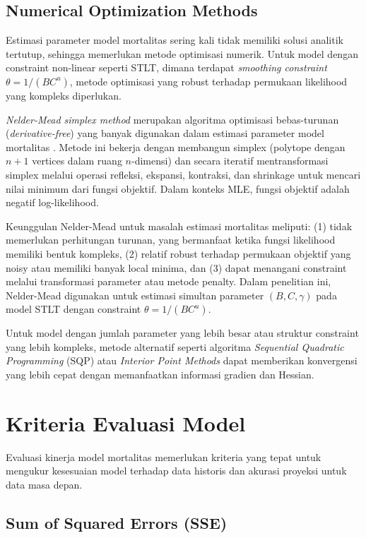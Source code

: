 \subsection{Numerical Optimization Methods}

Estimasi parameter model mortalitas sering kali tidak memiliki solusi analitik tertutup, sehingga memerlukan metode optimisasi numerik. Untuk model dengan constraint non-linear seperti STLT, dimana terdapat \textit{smoothing constraint} $\theta = 1/(BC^u)$, metode optimisasi yang robust terhadap permukaan likelihood yang kompleks diperlukan.

\textit{Nelder-Mead simplex method} merupakan algoritma optimisasi bebas-turunan (\textit{derivative-free}) yang banyak digunakan dalam estimasi parameter model mortalitas \citep{nelder1965simplex}. Metode ini bekerja dengan membangun simplex (polytope dengan $n+1$ vertices dalam ruang $n$-dimensi) dan secara iteratif mentransformasi simplex melalui operasi refleksi, ekspansi, kontraksi, dan shrinkage untuk mencari nilai minimum dari fungsi objektif. Dalam konteks MLE, fungsi objektif adalah negatif log-likelihood.

Keunggulan Nelder-Mead untuk masalah estimasi mortalitas meliputi: (1) tidak memerlukan perhitungan turunan, yang bermanfaat ketika fungsi likelihood memiliki bentuk kompleks, (2) relatif robust terhadap permukaan objektif yang noisy atau memiliki banyak local minima, dan (3) dapat menangani constraint melalui transformasi parameter atau metode penalty. Dalam penelitian ini, Nelder-Mead digunakan untuk estimasi simultan parameter $(B, C, \gamma)$ pada model STLT dengan constraint $\theta = 1/(BC^u)$.

Untuk model dengan jumlah parameter yang lebih besar atau struktur constraint yang lebih kompleks, metode alternatif seperti algoritma \textit{Sequential Quadratic Programming} (SQP) atau \textit{Interior Point Methods} dapat memberikan konvergensi yang lebih cepat dengan memanfaatkan informasi gradien dan Hessian.

\section{Kriteria Evaluasi Model}

Evaluasi kinerja model mortalitas memerlukan kriteria yang tepat untuk mengukur kesesuaian model terhadap data historis dan akurasi proyeksi untuk data masa depan.

\subsection{Sum of Squared Errors (SSE)}

